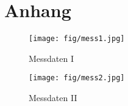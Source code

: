\newpage
\section{Anhang}
\label{sec:anhang}
\begin{figure}[h!]
  \centering
  \texttt{[image: fig/mess1.jpg]}
  \caption{Messdaten I}
  \label{abb:mess1}
\end{figure}
\begin{figure}[h!]
  \centering
  \texttt{[image: fig/mess2.jpg]}
  \caption{Messdaten II}
  \label{abb:mess2}
\end{figure}
